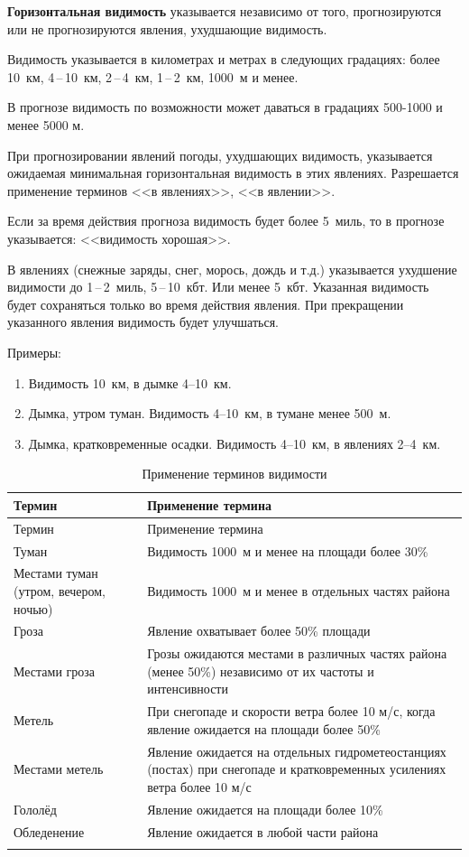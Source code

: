 \documentclass[a4paper, 12pt, twoside, final, book, russian, fittopage, cyremdash, openright]{ncc}
\newcommand{\otdo}{\,--\,}
\begin{document}
\textbf{Горизонтальная видимость} указывается независимо от того,
прогнозируются или не прогнозируются явления, ухудшающие видимость.

Видимость указывается в километрах и метрах в следующих градациях:
более 10~км, 4\otdo10~км, 2\otdo4~км, 1\otdo2~км, 1000~м и менее.

В прогнозе видимость по возможности может даваться в градациях
500-1000 и менее 5000 м.

При прогнозировании явлений погоды, ухудшающих видимость, указывается
ожидаемая минимальная горизонтальная видимость в этих
явлениях. Разрешается применение терминов <<в явлениях>>,
<<в явлении>>.

Если за время действия прогноза видимость будет более 5~миль, то в
прогнозе указывается: <<видимость хорошая>>.

В явлениях (снежные заряды, снег, морось, дождь и т.д.) указывается
ухудшение видимости до 1\otdo2~миль, 5\otdo10~кбт. Или менее
5~кбт. Указанная видимость будет сохраняться только во время действия
явления. При прекращении указанного явления видимость будет
улучшаться.

Примеры:
\begin{enumerate}[label={}]
\item Видимость 10~км, в дымке 4--10~км.
\item Дымка, утром туман. Видимость 4--10~км, в тумане менее 500~м.
\item Дымка, кратковременные осадки. Видимость 4--10~км, в явлениях 2--4~км.
\end{enumerate}

\begin{longtable}{p{}|p{}}
  \toprule
  Термин & Применение термина \\
  \midrule
  \endfirsthead
  \toprule
  Термин & Применение термина \\
  \midrule
  \endhead
  Туман
         & Видимость 1000~м и менее на площади более 30\% \\
  \midrule
  Местами туман (утром, вечером, ночью)
         & Видимость 1000~м и менее в отдельных частях района \\
  \midrule
  Гроза
         & Явление охватывает более 50\% площади \\
  \midrule
  Местами гроза
         & Грозы ожидаются местами в различных частях района (менее 50\%) независимо от их частоты и интенсивности \\
  \midrule
  Метель
         & При снегопаде и скорости ветра более 10 м/с, когда явление ожидается на площади более 50\% \\
  \midrule
  Местами метель
         & Явление ожидается на отдельных гидрометеостанциях (постах) при снегопаде и кратковременных усилениях ветра более 10 м/с \\
  \midrule
  Гололёд
         & Явление ожидается на площади более 10\% \\
  \midrule
  Обледенение
         & Явление ожидается в любой части района \\
  \bottomrule
  \caption{Применение терминов видимости}
\end{longtable}
\end{document}
